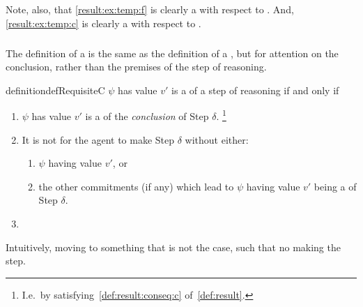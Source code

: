\begin{note}
  Note, also, that \ref{result:ex:temp:f} is clearly a  with respect to \CStepB{}.
  And, \ref{result:ex:temp:c} is clearly a \prequ{} with respect to \CStepC{}.
\end{note}

\subparagraph{}

\begin{note}
  The definition of a  is the same as the definition of a , but for attention on the conclusion, rather than the premises of the step of reasoning.
\end{note}

\begin{note}
  \begin{restatable}{definition}{defRequisiteC}
    \label{def:crequ}
    \(\psi\) has value \(v'\) is a \emph{} of a step of reasoning if and only if
    \begin{enumerate}[label=\arabic*., ref=\named{cR:\arabic*}]
    \item
      \(\psi\) has value \(v'\) is a  of the \emph{conclusion} of Step \(\delta\).\nolinebreak
      \footnote{
        I.e.\ by satisfying~\ref{def:result:conseq:c} of~\autoref{def:result}.
      }
    \item
      \label{def:crequ:subjunctive}
      It is not \epVAd{} for the agent to make Step \(\delta\) without either:
      \begin{enumerate}[label=\alph*., ref=\named{cR:2\alph*}]
      \item \(\psi\) having value \(v'\), or
      \item the other commitments (if any) which lead to \(\psi\) having value \(v'\) being a  of Step \(\delta\).
      \end{enumerate}
    \item
      \requGlobalClause{}
    \end{enumerate}
    \vspace{-\baselineskip}
  \end{restatable}
\end{note}

\begin{note}
  Intuitively, moving to something that is not the case, such that no making the step.
\end{note}


